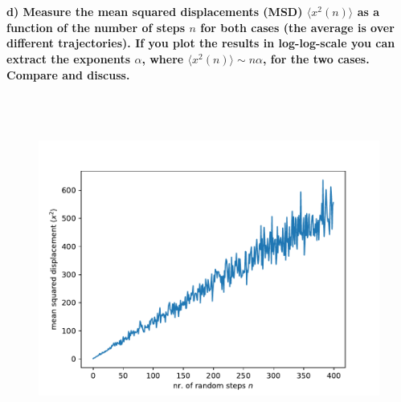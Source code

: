 \begin{figure}[h!]
\begin{minipage}{.5\linewidth}
{          }
        \end{minipage}
    \end{figure} \ \\

\paragraph{d) Measure the mean squared displacements (MSD) 
    $\langle x^2(n)\rangle$ as a function of the number of steps $n$ 
    for both cases (the average is over different trajectories). If you 
    plot the results in log-log-scale you can extract the exponents 
    $\alpha$, where $\langle x^2(n)\rangle\sim n\alpha$, for the two 
    cases. Compare and discuss.
} \ \\
\\
    \begin{figure}[h!]
        \centering
        \includegraphics[width=\textwidth]{./figures/MSD_vs_N.pdf}
        \caption{}
    \end{figure} \ \\ 

